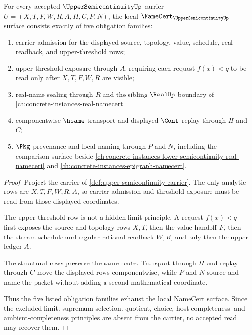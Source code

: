 \begin{theorem}
\label{thm:upper-semicontinuity-namecert-obligations}
For every accepted $\UpperSemicontinuityUp$ carrier $U=(X,T,F,W,R,A,H,C,P,N)$, the local $\NameCert_{\UpperSemicontinuityUp}$ surface consists exactly of five obligation families:
\begin{enumerate}
\item carrier admission for the displayed source, topology, value, schedule, real-readback, and upper-threshold rows;
\item upper-threshold exposure through $A$, requiring each request $f(x)<q$ to be read only after $X,T,F,W,R$ are visible;
\item real-name sealing through $R$ and the sibling $\RealUp$ boundary of \autoref{ch:concrete-instances-real-namecert};
\item componentwise $\hsame$ transport and displayed $\Cont$ replay through $H$ and $C$;
\item $\Pkg$ provenance and local naming through $P$ and $N$, including the comparison surface beside \autoref{ch:concrete-instances-lower-semicontinuity-real-namecert} and \autoref{ch:concrete-instances-epigraph-namecert}.
\end{enumerate}
\end{theorem}
\begin{proof}
Project the carrier of \autoref{def:upper-semicontinuity-carrier}. The only analytic rows are $X,T,F,W,R,A$, so carrier admission and threshold exposure must be read from those displayed coordinates.

The upper-threshold row is not a hidden limit principle. A request $f(x)<q$ first exposes the source and topology rows $X,T$, then the value handoff $F$, then the stream schedule and regular-rational readback $W,R$, and only then the upper ledger $A$.

The structural rows preserve the same route. Transport through $H$ and replay through $C$ move the displayed rows componentwise, while $P$ and $N$ source and name the packet without adding a second mathematical coordinate.

Thus the five listed obligation families exhaust the local NameCert surface. Since the excluded limit, supremum-selection, quotient, choice, host-completeness, and ambient-completeness principles are absent from the carrier, no accepted read may recover them.
\end{proof}

